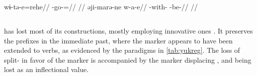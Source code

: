 \carijo \parencite[][5, 42]{guerrero2016karihona}
\begingl
\gla wɨ-tə-e=rehe//
\glb {}-go-=//
\glft {}//
\endgl
{}
\begingl
\gla əji-marə-ne w-a-e//
\glb {}-with- -be-//
\glft {}//
\endgl
\xe
%
%
%

\subsection{\yukpa {}}
\label{sec:yukpa}
\yukpa has lost most of its \setone constructions, mostly employing innovative ones \parencite{meira2006syntactic}.
It preserves the \setone prefixes in the immediate past, where the  marker appears to have been extended to  verbs, as evidenced by the paradigms in \cref{tab:yukreg}.
The loss of split- in favor of the  marker is accompanied by the  marker  displacing  , and  being lost as an inflectional value.



